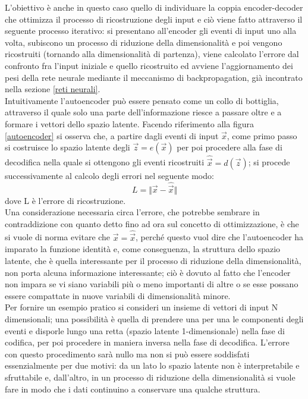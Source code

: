 L'obiettivo è anche in questo caso quello di individuare la coppia encoder-decoder che ottimizza il processo di ricostruzione degli input e ciò viene fatto attraverso il seguente processo iterativo: si presentano all'encoder gli eventi di input uno alla volta, subiscono un processo di riduzione della dimensionalità e poi vengono ricostruiti (tornando alla dimensionalità di partenza), viene calcolato l'errore dal confronto fra l'input iniziale e quello ricostruito ed avviene l'aggiornamento dei pesi della rete neurale mediante il meccanismo di backpropagation, già incontrato nella sezione \ref{reti neurali}. \\
Intuitivamente l'autoencoder può essere pensato come un collo di bottiglia, attraverso il quale solo una parte dell'informazione riesce a passare oltre e a formare i vettori dello spazio latente.
Facendo riferimento alla figura \ref{autoencoder} si osserva che, a partire dagli eventi di input $\vec{x}$, come primo passo si costruisce lo spazio latente degli $\vec{z} = e(\vec{x})$ per poi procedere alla fase di decodifica nella quale si ottengono gli eventi ricostruiti $\hat{\vec{x}} = d(\vec{z})$; si procede successivamente al calcolo degli errori nel seguente modo:
\begin{equation}
	L = \Vert \vec{x} - \hat{\vec{x}} \Vert
\end{equation}
dove L è l'errore di ricostruzione.\\
Una considerazione necessaria circa l'errore, che potrebbe sembrare in contraddizione con quanto detto fino ad ora sul concetto di ottimizzazione, è che si vuole di norma evitare che $\vec{x} = \hat{\vec{x}}$, perché questo vuol dire che l'autoencoder ha imparato la funzione identità e, come conseguenza, la struttura dello spazio latente, che è quella interessante per il processo di riduzione della dimensionalità, non porta alcuna informazione interessante; ciò è dovuto al fatto che l'encoder non impara se vi siano variabili più o meno importanti di altre o se esse possano essere compattate in nuove variabili di dimensionalità minore. \\
Per fornire un esempio pratico si consideri un insieme di vettori di input N dimensionali; una possibilità è quella di prendere una per una le componenti degli eventi e disporle lungo una retta (spazio latente 1-dimensionale) nella fase di codifica, per poi procedere in maniera inversa nella fase di decodifica. L'errore con questo procedimento sarà nullo ma non si può essere soddisfati essenzialmente per due motivi: da un lato lo spazio latente non è interpretabile e sfruttabile e, dall'altro, in un processo di riduzione della dimensionalità si vuole fare in modo che i dati continuino a conservare una qualche struttura. \\
